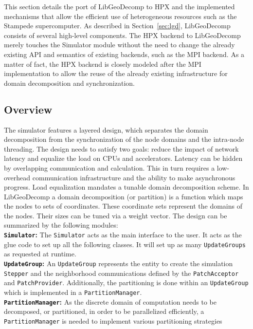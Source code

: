 \documentclass{sig-alternate}
\newcommand{\B}[1]{\textbf{#1}}
\newcommand{\ctype}[1]{\texttt{{{#1}}}}
\begin{document}
This section details the port of LibGeoDecomp to HPX and the implemented mechanisms
that allow the efficient use of heterogeneous resources such as the Stampede supercomputer.
As described in Section~\ref{sec:lgd}, LibGeoDecomp consists of several high-level components.
The HPX backend to LibGeoDecomp merely touches the Simulator module without the need to change
the already existing API and semantics of existing backends, such as the MPI backend. As a
matter of fact, the HPX backend is closely modeled after the MPI implementation to allow the reuse
of the already existing infrastructure for domain decomposition and synchronization.

\subsection{Overview}
\label{sec:implementation:overview}
The simulator features a layered design, which
separates the domain decomposition from the synchronization of the
node domains and the intra-node threading. The design needs to satisfy
two goals: reduce the impact of network latency and equalize the load
on CPUs and accelerators. Latency can be hidden by overlapping
communication and calculation. This in turn requires a low-over\-head
communication infrastructure and the ability to make asynchronous
progress. Load equalization mandates a tunable domain decomposition
scheme. In LibGeoDecomp a domain decomposition (or partition) is a
function which maps the nodes to sets of coordinates. These coordinate
sets represent the domains of the nodes. Their sizes can be tuned via
a weight vector. The design can be summarized by the following modules: \\
\B{\ctype{Simulator}:} The \ctype{Simulator} acts as the main interface to the
user. It acts as the glue code to set up all the following classes. It will set up as many
\ctype{UpdateGroups} as requested at runtime. \\
\B{\ctype{UpdateGroup}:} An \ctype{UpdateGroup} represents the entity to create
the simulation \ctype{Stepper} and the neighbor\-hood communications
defined by the \ctype{PatchAcceptor} and \ctype{PatchProvider}. Additionally,
the partitioning is done within an \ctype{UpdateGroup} which is implemented in a
\ctype{PartitionManager}. \\
\B{\ctype{PartitionManager}:} As the discrete domain of computation needs to be
decomposed, or partitioned, in order to be parallelized efficiently, a
\ctype{PartitionManager} is needed to implement various partitioning strategies
\end{document}

